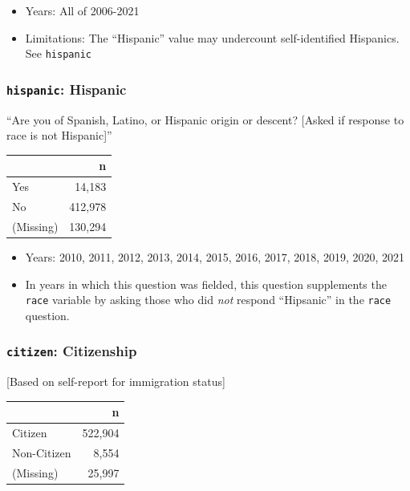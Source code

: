 \documentclass[10pt,article,oneside]{memoir}
\theoremstyle{definition}
\begin{document}
\begin{itemize}
\tightlist
\item
  Years: All of 2006-2021
\item
  Limitations: The ``Hispanic'' value may undercount self-identified
  Hispanics. See \texttt{hispanic}
\end{itemize}

\hypertarget{hispanic-hispanic}{%
\subsubsection{\texorpdfstring{\texttt{hispanic}:
Hispanic}{hispanic: Hispanic}}\label{hispanic-hispanic}}

``Are you of Spanish, Latino, or Hispanic origin or descent? {[}Asked if
response to race is not Hispanic{]}''

\begin{table}[H]
\centering
\begin{tabular}[t]{lr}
\toprule
 & n\\
\midrule
Yes & 14,183\\
No & 412,978\\
(Missing) & 130,294\\
\bottomrule
\end{tabular}
\end{table}

\begin{itemize}
\tightlist
\item
  Years: 2010, 2011, 2012, 2013, 2014, 2015, 2016, 2017, 2018, 2019,
  2020, 2021
\item
  In years in which this question was fielded, this question supplements
  the \texttt{race} variable by asking those who did \emph{not} respond
  ``Hipsanic'' in the \texttt{race} question.
\end{itemize}

\hypertarget{citizen-citizenship}{%
\subsubsection{\texorpdfstring{\texttt{citizen}:
Citizenship}{citizen: Citizenship}}\label{citizen-citizenship}}

{[}Based on self-report for immigration status{]}

\begin{table}[H]
\centering
\begin{tabular}[t]{lr}
\toprule
 & n\\
\midrule
Citizen & 522,904\\
Non-Citizen & 8,554\\
(Missing) & 25,997\\
\bottomrule
\end{tabular}
\end{table}
\end{document}
